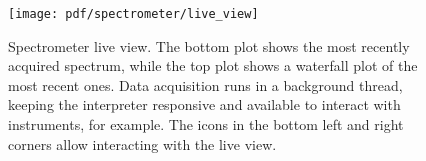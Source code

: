 \begin{figure}
    \centering
    \texttt{[image: pdf/spectrometer/live\_view]}
    \caption[Spectrometer live view]{
        Spectrometer live view.
        The bottom plot shows the most recently acquired spectrum, while the top plot shows a waterfall plot of the most recent ones.
        Data acquisition runs in a background thread, keeping the interpreter responsive and available to interact with instruments, for example.
        The icons in the bottom left and right corners allow interacting with the live view.
    }
    \label{fig:speck:software:live_view}
\end{figure}
